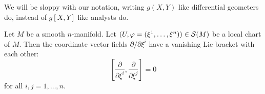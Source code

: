 
\lecture{}

\begin{node}
We will be sloppy with our notation, writing $g(X,Y)$ like
differential geometers do, instead of $g[X,Y]$ like analysts do.
\end{node}

\begin{lemma}
Let $M$ be a smooth $n$-manifold. Let
$(U,\varphi=(\xi^{1},\dots,\xi^{n}))\in\mathcal{S}(M)$ be a local chart
of $M$. Then the coordinate vector fields $\partial/\partial\xi^{i}$
have a vanishing Lie bracket with each other:
\begin{equation}
\left[\frac{\partial}{\partial\xi^{i}},\frac{\partial}{\partial\xi^{j}}\right]=0
\end{equation}
for all $i,j=1,\dots,n$.
\end{lemma}

